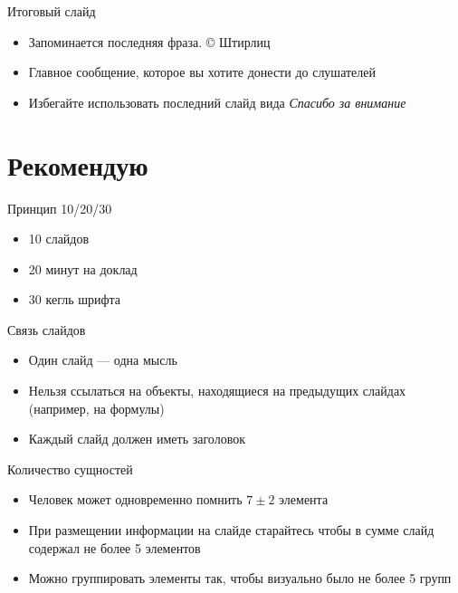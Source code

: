 \documentclass[
  ignorenonframetext,
  aspectratio=169,
]{beamer}
\providecommand{\tightlist}{%
  \setlength{\itemsep}{0pt}\setlength{\parskip}{0pt}}\usepackage{longtable,booktabs,array}
\begin{document}
\begin{frame}{Итоговый слайд}
\label{ux438ux442ux43eux433ux43eux432ux44bux439-ux441ux43bux430ux439ux434}
\begin{itemize}[<+->]
\tightlist
\item
  Запоминается последняя фраза. © Штирлиц
\item
  Главное сообщение, которое вы хотите донести до слушателей
\item
  Избегайте использовать последний слайд вида \emph{Спасибо за внимание}
\end{itemize}
\end{frame}

\section{Рекомендую}\label{ux440ux435ux43aux43eux43cux435ux43dux434ux443ux44e}

\begin{frame}{Принцип 10/20/30}
\label{ux43fux440ux438ux43dux446ux438ux43f-102030}
\begin{itemize}[<+->]
\tightlist
\item
  10 слайдов
\item
  20 минут на доклад
\item
  30 кегль шрифта
\end{itemize}
\end{frame}

\begin{frame}{Связь слайдов}
\label{ux441ux432ux44fux437ux44c-ux441ux43bux430ux439ux434ux43eux432}
\begin{itemize}[<+->]
\tightlist
\item
  Один слайд --- одна мысль
\item
  Нельзя ссылаться на объекты, находящиеся на предыдущих слайдах
  (например, на формулы)
\item
  Каждый слайд должен иметь заголовок
\end{itemize}
\end{frame}

\begin{frame}{Количество сущностей}
\label{ux43aux43eux43bux438ux447ux435ux441ux442ux432ux43e-ux441ux443ux449ux43dux43eux441ux442ux435ux439}
\begin{itemize}[<+->]
\tightlist
\item
  Человек может одновременно помнить \(7 \pm 2\) элемента
\item
  При размещении информации на слайде старайтесь чтобы в сумме слайд
  содержал не более 5 элементов
\item
  Можно группировать элементы так, чтобы визуально было не более 5 групп
\end{itemize}
\end{frame}
\end{document}

